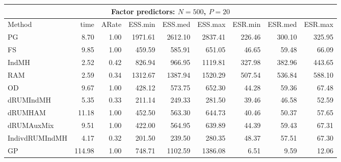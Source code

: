 \begin{table}
\begin{tabular}{l r r r r r r r r } 
\hline
\multicolumn{9}{c}{Factor predictors: $N=500$, $P=20$} \\
\hline
          Method  &   time &  ARate & ESS.min & ESS.med & ESS.max & ESR.min & ESR.med & ESR.max \\ 
            PG  &     8.70 &     1.00 &   1971.61 &   2612.10 &   2837.41 &    226.46 &    300.10 &    325.95 \\ 
            FS  &     9.85 &     1.00 &    459.59 &    585.91 &    651.05 &     46.65 &     59.48 &     66.09 \\ 
         IndMH  &     2.52 &     0.42 &    826.94 &    966.95 &   1119.81 &    327.98 &    382.96 &    443.65 \\ 
           RAM  &     2.59 &     0.34 &   1312.67 &   1387.94 &   1520.29 &    507.54 &    536.84 &    588.10 \\ 
            OD  &     9.67 &     1.00 &    428.12 &    573.75 &    652.30 &     44.28 &     59.36 &     67.48 \\ 
     dRUMIndMH  &     5.35 &     0.33 &    211.14 &    249.33 &    281.50 &     39.46 &     46.58 &     52.59 \\ 
       dRUMHAM  &    11.18 &     1.00 &    452.50 &    563.30 &    644.73 &     40.46 &     50.37 &     57.65 \\ 
    dRUMAuxMix  &     9.51 &     1.00 &    422.00 &    564.95 &    639.89 &     44.39 &     59.43 &     67.31 \\ 
IndivdRUMIndMH  &     4.17 &     0.32 &    201.50 &    239.50 &    280.35 &     48.37 &     57.51 &     67.30 \\ 
            GP  &   114.98 &     1.00 &    748.71 &   1102.59 &   1386.08 &      6.51 &      9.59 &     12.06
 \end{tabular}

\end{table}


